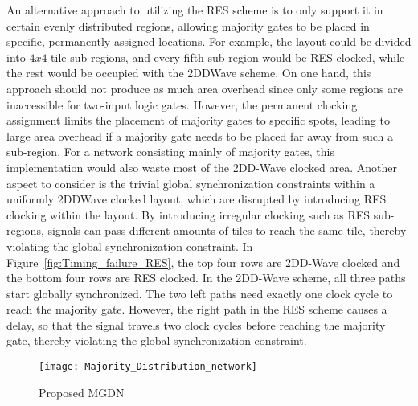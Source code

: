 An alternative approach to utilizing the RES scheme is to only support it in certain evenly distributed regions, allowing majority gates to be placed in specific, permanently assigned locations. For example, the layout could be divided into $4x4$ tile sub-regions, and every fifth sub-region would be RES clocked, while the rest would be occupied with the 2DDWave scheme. On one hand, this approach should not produce as much area overhead since only some regions are inaccessible for two-input logic gates. However, the permanent clocking assignment limits the placement of majority gates to specific spots, leading to large area overhead if a majority gate needs to be placed far away from such a sub-region. For a network consisting mainly of majority gates, this implementation would also waste most of the 2DD-Wave clocked area. Another aspect to consider is the trivial global synchronization constraints within a uniformly 2DDWave clocked layout, which are disrupted by introducing RES clocking within the layout. By introducing irregular clocking such as RES sub-regions, signals can pass different amounts of tiles to reach the same tile, thereby violating the global synchronization constraint. In Figure~\ref{fig:Timing_failure_RES}, the top four rows are 2DD-Wave clocked and the bottom four rows are RES clocked. In the 2DD-Wave scheme, all three paths start globally synchronized. The two left paths need exactly one clock cycle to reach the majority gate. However, the right path in the RES scheme causes a delay, so that the signal travels two clock cycles before reaching the majority gate, thereby violating the global synchronization constraint.


\begin{figure}
	\centering
	\texttt{[image: Majority\_Distribution\_network]}
	\caption{Proposed MGDN}\label{fig:QCA_Maj_nw}
\end{figure}


